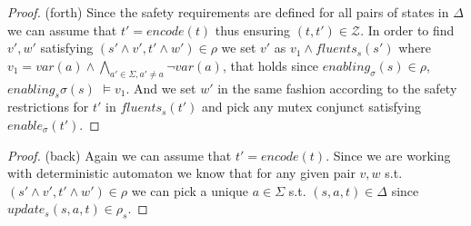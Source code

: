 \begin{proof}{(forth)}
Since the safety requirements are defined for all pairs of states in $\Delta$
we can assume that $t' = encode(t)$ thus ensuring $(t,t') \in \mathcal{Z}$.
In order to find $v',w'$ satisfying $(s' \wedge v',t' \wedge w') \in \rho$ we
set $v'$ as $v_1 \wedge fluents_s(s')$ where
$v_1 = var(a) \wedge \bigwedge_{a'\in \Sigma, a' \neq a}\neg var(a)$, that holds since $enabling_{\sigma}(s) \in \rho$, $enabling_s{\sigma}(s) $ $\models v_1$. 
And we set $w'$ in the same fashion according to the safety restrictions for
$t'$ in $fluents_s(t')$ and pick any mutex conjunct satisfying $enable_\sigma(t')$.
\end{proof}
\begin{proof}{(back)}
Again we can assume that $t' = encode(t)$.
Since we are working with deterministic automaton we know that
for any given pair $v,w$ s.t. $(s' \wedge v', t' \wedge w') \in \rho$
we can pick a unique $a \in \Sigma$ s.t. $(s, a, t) \in \Delta$ since
$update_s(s,a,t) \in \rho_s$.
\end{proof}